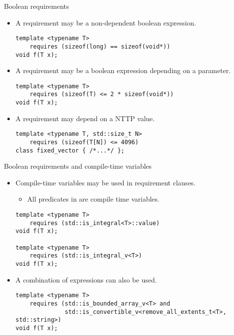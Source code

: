 \begin{frame}[t,fragile]{Boolean requirements}
\begin{itemize}
  \item A requirement may be a non-dependent boolean expression.
\begin{lstlisting}
template <typename T>
    requires (sizeof(long) == sizeof(void*))
void f(T x);
\end{lstlisting}

  \item A requirement may be a boolean expression depending on a parameter.
\begin{lstlisting}
template <typename T>
    requires (sizeof(T) <= 2 * sizeof(void*))
void f(T x);
\end{lstlisting}

  \item A requirement may depend on a NTTP value.
\begin{lstlisting}
template <typename T, std::size_t N>
    requires (sizeof(T[N]) <= 4096)
class fixed_vector { /*...*/ };
\end{lstlisting}

\end{itemize}
\end{frame}

\begin{frame}[t,fragile]{Boolean requirements and compile-time variables}
\begin{itemize}
  \item Compile-time variables may be used in requirement clauses.
    \begin{itemize}
      \item All predicates in  are compile time variables.
    \end{itemize}
\begin{lstlisting}
template <typename T>
    requires (std::is_integral<T>::value)
void f(T x);

template <typename T>
    requires (std::is_integral_v<T>)
void f(T x);
\end{lstlisting}

  \item A combination of expressions can also be used.
\begin{lstlisting}
template <typename T>
    requires (std::is_bounded_array_v<T> and 
              std::is_convertible_v<remove_all_extents_t<T>, std::string>)
void f(T x);
\end{lstlisting}

\end{itemize}
\end{frame}

